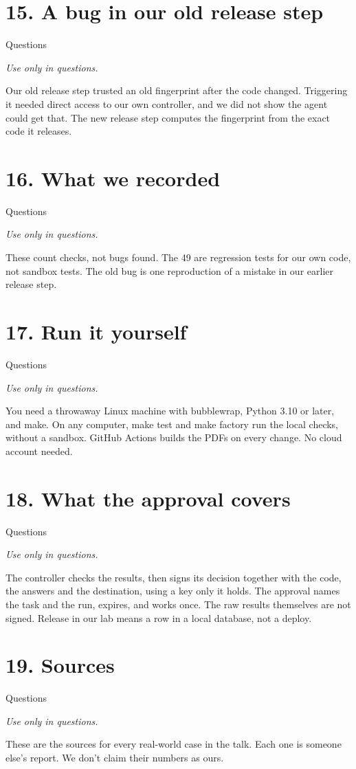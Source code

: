 \documentclass[11pt]{article}
\begin{document}
\section*{15. A bug in our old release step}
{\sffamily\color{acid}Questions}\par
{\itshape Use only in questions.}\par
Our old release step trusted an old fingerprint after the code changed. Triggering it needed direct access to our own controller, and we did not show the agent could get that. The new release step computes the fingerprint from the exact code it releases.
\section*{16. What we recorded}
{\sffamily\color{acid}Questions}\par
{\itshape Use only in questions.}\par
These count checks, not bugs found. The 49 are regression tests for our own code, not sandbox tests. The old bug is one reproduction of a mistake in our earlier release step.
\section*{17. Run it yourself}
{\sffamily\color{acid}Questions}\par
{\itshape Use only in questions.}\par
You need a throwaway Linux machine with bubblewrap, Python 3.10 or later, and make. On any computer, make test and make factory run the local checks, without a sandbox. GitHub Actions builds the PDFs on every change. No cloud account needed.
\section*{18. What the approval covers}
{\sffamily\color{acid}Questions}\par
{\itshape Use only in questions.}\par
The controller checks the results, then signs its decision together with the code, the answers and the destination, using a key only it holds. The approval names the task and the run, expires, and works once. The raw results themselves are not signed. Release in our lab means a row in a local database, not a deploy.
\section*{19. Sources}
{\sffamily\color{acid}Questions}\par
{\itshape Use only in questions.}\par
These are the sources for every real-world case in the talk. Each one is someone else's report. We don't claim their numbers as ours.
\end{document}
